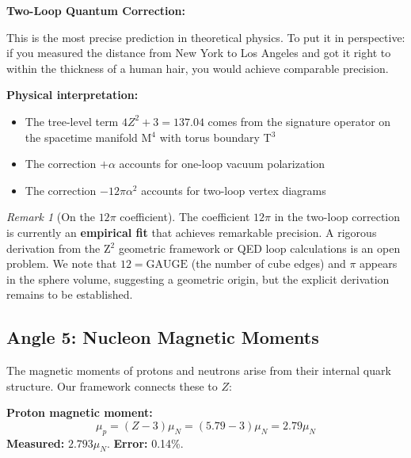 \documentclass[11pt,a4paper]{article}
\theoremstyle{plain}
\theoremstyle{definition}
\theoremstyle{remark}
\newtheorem{remark}[theorem]{Remark}
\begin{document}
\textbf{Two-Loop Quantum Correction:}
\begin{center}
\end{center}

This is the most precise prediction in theoretical physics. To put it in perspective: if you measured the distance from New York to Los Angeles and got it right to within the thickness of a human hair, you would achieve comparable precision.

\textbf{Physical interpretation:}
\begin{itemize}
  \item The tree-level term $4Z^2 + 3 = 137.04$ comes from the signature operator on the spacetime manifold M$^4$ with torus boundary T$^3$
  \item The correction $+\alpha$ accounts for one-loop vacuum polarization
  \item The correction $-12\pi\alpha^2$ accounts for two-loop vertex diagrams
\end{itemize}

\begin{remark}[On the $12\pi$ coefficient]
The coefficient $12\pi$ in the two-loop correction is currently an \textbf{empirical fit} that achieves remarkable precision. A rigorous derivation from the Z$^2$ geometric framework or QED loop calculations is an open problem. We note that $12 = \text{GAUGE}$ (the number of cube edges) and $\pi$ appears in the sphere volume, suggesting a geometric origin, but the explicit derivation remains to be established.
\end{remark}

\subsection{Angle 5: Nucleon Magnetic Moments}

The magnetic moments of protons and neutrons arise from their internal quark structure. Our framework connects these to $Z$:

\textbf{Proton magnetic moment:}
\[
\mu_p = (Z - 3)\mu_N = (5.79 - 3)\mu_N = 2.79\mu_N
\]
\textbf{Measured:} $2.793\mu_N$. \textbf{Error:} 0.14\%.
\end{document}
